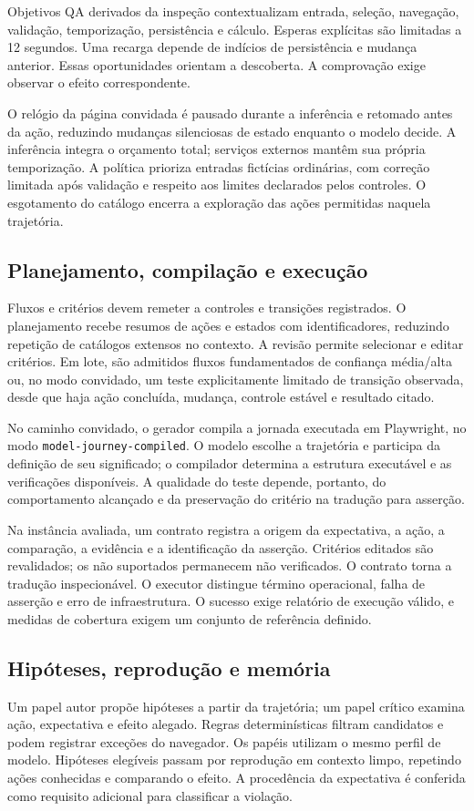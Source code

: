 \documentclass[12pt]{article}
\begin{document}
Objetivos QA derivados da inspeção contextualizam entrada, seleção, navegação, validação, temporização, persistência e cálculo. Esperas explícitas são limitadas a 12 segundos. Uma recarga depende de indícios de persistência e mudança anterior. Essas oportunidades orientam a descoberta. A comprovação exige observar o efeito correspondente.

O relógio da página convidada é pausado durante a inferência e retomado antes da ação, reduzindo mudanças silenciosas de estado enquanto o modelo decide. A inferência integra o orçamento total; serviços externos mantêm sua própria temporização. A política prioriza entradas fictícias ordinárias, com correção limitada após validação e respeito aos limites declarados pelos controles. O esgotamento do catálogo encerra a exploração das ações permitidas naquela trajetória.

\subsection{Planejamento, compilação e execução}
Fluxos e critérios devem remeter a controles e transições registrados. O planejamento recebe resumos de ações e estados com identificadores, reduzindo repetição de catálogos extensos no contexto. A revisão permite selecionar e editar critérios. Em lote, são admitidos fluxos fundamentados de confiança média/alta ou, no modo convidado, um teste explicitamente limitado de transição observada, desde que haja ação concluída, mudança, controle estável e resultado citado.

No caminho convidado, o gerador compila a jornada executada em Playwright, no modo \texttt{model-journey-compiled}. O modelo escolhe a trajetória e participa da definição de seu significado; o compilador determina a estrutura executável e as verificações disponíveis. A qualidade do teste depende, portanto, do comportamento alcançado e da preservação do critério na tradução para asserção.

Na instância avaliada, um contrato registra a origem da expectativa, a ação, a comparação, a evidência e a identificação da asserção. Critérios editados são revalidados; os não suportados permanecem não verificados. O contrato torna a tradução inspecionável. O executor distingue término operacional, falha de asserção e erro de infraestrutura. O sucesso exige relatório de execução válido, e medidas de cobertura exigem um conjunto de referência definido.

\subsection{Hipóteses, reprodução e memória}
Um papel autor propõe hipóteses a partir da trajetória; um papel crítico examina ação, expectativa e efeito alegado. Regras determinísticas filtram candidatos e podem registrar exceções do navegador. Os papéis utilizam o mesmo perfil de modelo. Hipóteses elegíveis passam por reprodução em contexto limpo, repetindo ações conhecidas e comparando o efeito. A procedência da expectativa é conferida como requisito adicional para classificar a violação.
\end{document}
